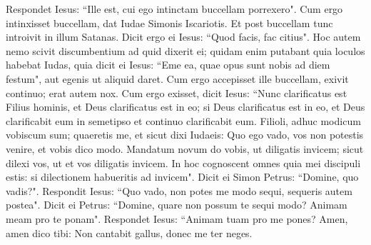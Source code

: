 \begin{biblechapter}
\verse Respondet Iesus: “Ille est, cui ego intinctam buccellam porrexero". Cum ergo intinxisset buccellam, dat Iudae Simonis Iscariotis. 
\verse Et post buccellam tunc introivit in illum Satanas. Dicit ergo ei Iesus: “Quod facis, fac citius". 
\verse Hoc autem nemo scivit discumbentium ad quid dixerit ei; 
\verse quidam enim putabant quia loculos habebat Iudas, quia dicit ei Iesus: “Eme ea, quae opus sunt nobis ad diem festum", aut egenis ut aliquid daret. 
\verse Cum ergo accepisset ille buccellam, exivit continuo; erat autem nox. 
\verse Cum ergo exisset, dicit Iesus: “Nunc clarificatus est Filius hominis, et Deus clarificatus est in eo; 
\verse si Deus clarificatus est in eo, et Deus clarificabit eum in semetipso et continuo clarificabit eum. 
\verse Filioli, adhuc modicum vobiscum sum; quaeretis me, et sicut dixi Iudaeis: Quo ego vado, vos non potestis venire, et vobis dico modo. 
\verse Mandatum novum do vobis, ut diligatis invicem; sicut dilexi vos, ut et vos diligatis invicem. 
\verse In hoc cognoscent omnes quia mei discipuli estis: si dilectionem habueritis ad invicem". 
\verse Dicit ei Simon Petrus: “Domine, quo vadis?". Respondit Iesus: “Quo vado, non potes me modo sequi, sequeris autem postea". 
\verse Dicit ei Petrus: “Domine, quare non possum te sequi modo? Animam meam pro te ponam". 
\verse Respondet Iesus: “Animam tuam pro me pones? Amen, amen dico tibi: Non cantabit gallus, donec me ter neges. 
\end{biblechapter}

